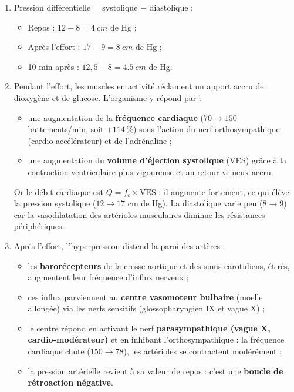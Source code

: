 \documentclass[11pt]{article}
\begin{document}
\begin{corrige}
\begin{enumerate}
\item Pression différentielle = systolique $-$ diastolique :
\begin{itemize}
\item Repos : $12 - 8 = \SI{4}{cm}$ de Hg ;
\item Après l'effort : $17 - 9 = \SI{8}{cm}$ de Hg ;
\item 10 min après : $12{,}5 - 8 = \SI{4,5}{cm}$ de Hg.
\end{itemize}
\item Pendant l'effort, les muscles en activité réclament un apport accru de dioxygène et de glucose. L'organisme y répond par :
\begin{itemize}
\item une augmentation de la \textbf{fréquence cardiaque} ($70 \to 150$ battements/min, soit $+114\,\%$) sous l'action du nerf orthosympathique (cardio-accélérateur) et de l'adrénaline ;
\item une augmentation du \textbf{volume d'éjection systolique} (VES) grâce à la contraction ventriculaire plus vigoureuse et au retour veineux accru.
\end{itemize}
Or le débit cardiaque est $Q = f_c \times \text{VES}$ : il augmente fortement, ce qui élève la pression systolique ($12 \to 17$ cm de Hg). La diastolique varie peu ($8 \to 9$) car la vasodilatation des artérioles musculaires diminue les résistances périphériques.
\item Après l'effort, l'hyperpression distend la paroi des artères :
\begin{itemize}
\item les \textbf{barorécepteurs} de la crosse aortique et des sinus carotidiens, étirés, augmentent leur fréquence d'influx nerveux ;
\item ces influx parviennent au \textbf{centre vasomoteur bulbaire} (moelle allongée) via les nerfs sensitifs (glossopharyngien IX et vague X) ;
\item le centre répond en activant le nerf \textbf{parasympathique (vague X, cardio-modérateur)} et en inhibant l'orthosympathique : la fréquence cardiaque chute ($150 \to 78$), les artérioles se contractent modérément ;
\item la pression artérielle revient à sa valeur de repos : c'est une \textbf{boucle de rétroaction négative}.
\end{itemize}
\end{enumerate}
\end{corrige}
\end{document}
